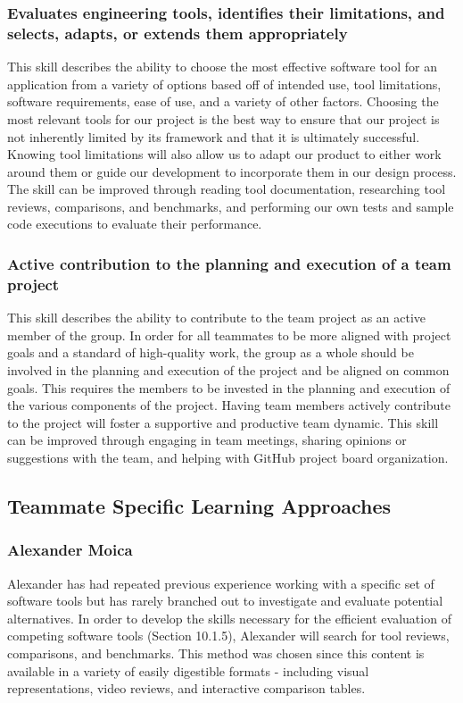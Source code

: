 \documentclass[12pt]{article}
\begin{document}
\subsubsection{Evaluates engineering tools, identifies their limitations, and selects, adapts, or extends them appropriately}
This skill describes the ability to choose the most effective software tool for an application from a variety of options based off of intended use, tool limitations, software requirements, ease of use, and a variety of other factors. Choosing the most relevant tools for our project is the best way to ensure that our project is not inherently limited by its framework and that it is ultimately successful. Knowing tool limitations will also allow us to adapt our product to either work around them or guide our development to incorporate them in our design process. The skill can be improved through reading tool documentation, researching tool reviews, comparisons, and benchmarks, and performing our own tests and sample code executions to evaluate their performance. 

\subsubsection{Active contribution to the planning and execution of a team project}
This skill describes the ability to contribute to the team project as an active member of the group. In order for all teammates to be more aligned with project goals and a standard of high-quality work, the group as a whole should be involved in the planning and execution of the project and be aligned on common goals. This requires the members to be invested in the planning and execution of the various components of the project. Having team members actively contribute to the project will foster a supportive and productive team dynamic. This skill can be improved through engaging in team meetings, sharing opinions or suggestions with the team, and helping with GitHub project board organization.

\subsection{Teammate Specific Learning Approaches}
\subsubsection{Alexander Moica}
Alexander has had repeated previous experience working with a specific set of software tools but has rarely branched out to investigate and evaluate potential alternatives. In order to develop the skills necessary for the efficient evaluation of competing software tools (Section 10.1.5), Alexander will search for tool reviews, comparisons, and benchmarks. This method was chosen since this content is available in a variety of easily digestible formats - including visual representations, video reviews, and interactive comparison tables.
\end{document}
